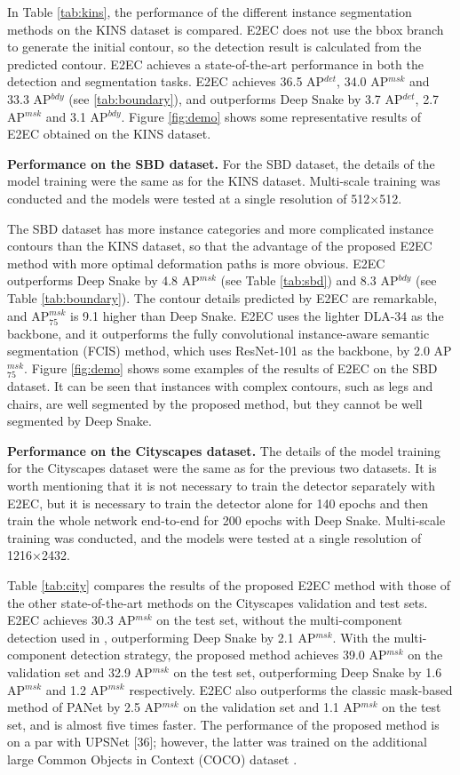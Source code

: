 \documentclass[10pt,twocolumn,letterpaper]{article}
\begin{document}
In Table \ref{tab:kins}, the performance of the different instance segmentation methods on the KINS dataset is compared. E2EC does not use the bbox branch to generate the initial contour, so the detection result is calculated from the predicted contour. E2EC achieves a state-of-the-art performance in both the detection and segmentation tasks. E2EC achieves 36.5 AP$^{det}$, 34.0 AP$^{msk}$ and 33.3 AP$^{bdy}$ (see \ref{tab:boundary}), and outperforms Deep Snake by 3.7 AP$^{det}$, 2.7 AP$^{msk}$ and 3.1 AP$^{bdy}$. Figure \ref{fig:demo} shows some representative results of E2EC obtained on the KINS dataset.

\textbf{Performance on the SBD dataset.} For the SBD dataset, the details of the model training were the same as for the KINS dataset. Multi-scale training was conducted and the models were tested at a single resolution of 512×512.

The SBD dataset has more instance categories and more complicated instance contours than the KINS dataset, so that the advantage of the proposed E2EC method with more optimal deformation paths is more obvious. E2EC outperforms Deep Snake by 4.8 AP$^{msk}$ (see Table \ref{tab:sbd}) and 8.3 AP$^{bdy}$ (see Table \ref{tab:boundary}). The contour details predicted by E2EC are remarkable, and AP$_{75}^{msk}$ is 9.1 higher than Deep Snake. E2EC uses the lighter DLA-34 as the backbone, and it outperforms the fully convolutional instance-aware semantic segmentation (FCIS) method, which uses ResNet-101 as the backbone, by 2.0 AP$_{75}^{msk}$. Figure \ref{fig:demo} shows some examples of the results of E2EC on the SBD dataset. It can be seen that instances with complex contours, such as legs and chairs, are well segmented by the proposed method, but they cannot be well segmented by Deep Snake.

\textbf{Performance on the Cityscapes dataset.} The details of the model training for the Cityscapes dataset were the same as for the previous two datasets. It is worth mentioning that it is not necessary to train the detector separately with E2EC, but it is necessary to train the detector alone for 140 epochs and then train the whole network end-to-end for 200 epochs with Deep Snake. Multi-scale training was conducted, and the models were tested at a single resolution of 1216×2432.

Table \ref{tab:city} compares the results of the proposed E2EC method with those of the other state-of-the-art methods on the Cityscapes validation and test sets. E2EC achieves 30.3 AP$^{msk}$ on the test set, without the multi-component detection used in \cite{deepsnake}, outperforming Deep Snake by 2.1 AP$^{msk}$. With the multi-component detection strategy, the proposed method achieves 39.0 AP$^{msk}$ on the validation set and 32.9 AP$^{msk}$ on the test set, outperforming Deep Snake by 1.6 AP$^{msk}$ and 1.2 AP$^{msk}$ respectively. E2EC also outperforms the classic mask-based method of PANet by 2.5 AP$^{msk}$ on the validation set and 1.1 AP$^{msk}$ on the test set, and is almost five times faster. The performance of the proposed method is on a par with UPSNet [36]; however, the latter was trained on the additional large Common Objects in Context (COCO) dataset \cite{coco}.
\end{document}
